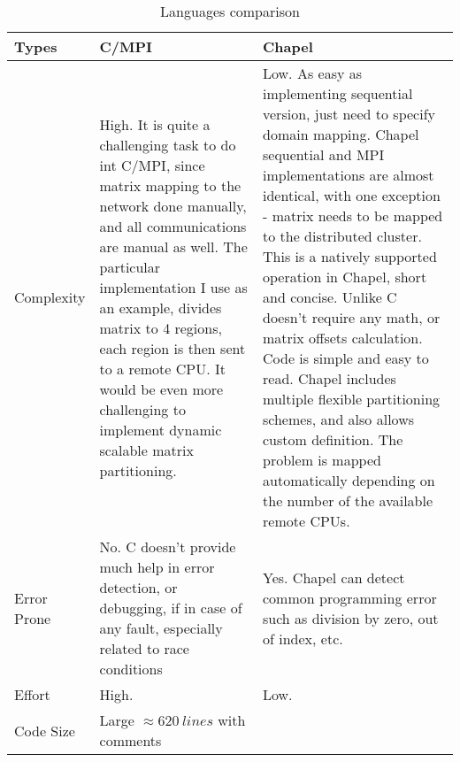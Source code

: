 \documentclass{article}
\begin{document}
        \begin{centering}
        \begin{table}[h!]
            \centering
            \caption{Languages comparison}
            \label{my-label}
            \begin{tabular}{l| p{7.5cm} | p{7.5cm}} \hline
              Types             &  C/MPI & Chapel \\ \hline
              Complexity    & 
                    High. It is quite a challenging task to do int C/MPI, since matrix
                    mapping to the network done manually, and all communications are manual as well.
                    The particular implementation I use as an example, divides matrix to 4 regions,
                    each region is then sent to a remote CPU. It would be even more challenging to 
                    implement dynamic scalable matrix partitioning.  &  

                    Low. As easy as implementing sequential version, just need to
                        specify domain mapping. Chapel sequential and MPI implementations are almost
                        identical, with one exception - matrix needs to be mapped to the distributed
                        cluster. This is a natively supported operation in Chapel, short and
                        concise. Unlike C doesn't require any math, or matrix offsets calculation.
                        Code is simple and easy to read. Chapel includes multiple flexible
                        partitioning schemes, and also allows custom definition. The problem is
                        mapped automatically depending on the number of the available remote CPUs.
                    
                    \\ \hline
              Error Prone  &  
                    No. C doesn't provide much help in error detection, or debugging, if
                        in case of any fault, especially related to race conditions
                
                &  
                    Yes. Chapel can detect common programming error such as division by zero, out of 
                    index, etc.
                \\ \hline
              Effort     &  
                    High.  
                &  
                    Low.
                \\ \hline
              Code Size     &   
                    Large $\approx 620\ lines$ with comments
                

\end{tabular}
\end{table}
\end{centering}
\end{document}
